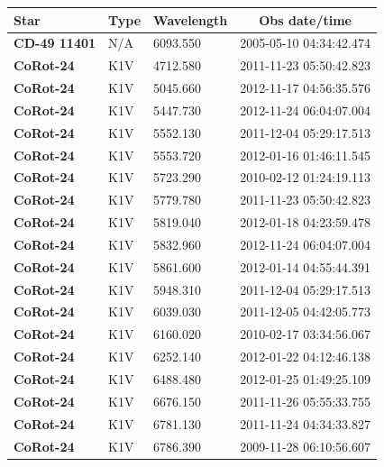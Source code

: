 \documentclass[linenumbers]{aastex701}
\providecommand{\DIFadd}[1]{{\bf #1}} %
\providecommand{\DIFaddbegin}{} %
\providecommand{\DIFaddend}{} %
\begin{document}
\begin{longtable}{|l|l|l|c|}
\hline
Star & Type & Wavelength & Obs date/time \\
\hline
 \DIFaddbegin \DIFadd{CD-49 11401 }\DIFaddend & N/A & 6093.550 & 2005-05-10 04:34:42.474 \\
 \DIFaddbegin \DIFadd{CoRot-24 }\DIFaddend & K1V & 4712.580 & 2011-11-23 05:50:42.823 \\
 \DIFaddbegin \DIFadd{CoRot-24 }\DIFaddend & K1V & 5045.660 & 2012-11-17 04:56:35.576 \\
 \DIFaddbegin \DIFadd{CoRot-24 }\DIFaddend & K1V & 5447.730 & 2012-11-24 06:04:07.004 \\
 \DIFaddbegin \DIFadd{CoRot-24 }\DIFaddend & K1V & 5552.130 & 2011-12-04 05:29:17.513 \\
 \DIFaddbegin \DIFadd{CoRot-24 }\DIFaddend & K1V & 5553.720 & 2012-01-16 01:46:11.545 \\
 \DIFaddbegin \DIFadd{CoRot-24 }\DIFaddend & K1V & 5723.290 & 2010-02-12 01:24:19.113 \\
 \DIFaddbegin \DIFadd{CoRot-24 }\DIFaddend & K1V & 5779.780 & 2011-11-23 05:50:42.823 \\
 \DIFaddbegin \DIFadd{CoRot-24 }\DIFaddend & K1V & 5819.040 & 2012-01-18 04:23:59.478 \\
 \DIFaddbegin \DIFadd{CoRot-24 }\DIFaddend & K1V & 5832.960 & 2012-11-24 06:04:07.004 \\
 \DIFaddbegin \DIFadd{CoRot-24 }\DIFaddend & K1V  & 5861.600 & 2012-01-14 04:55:44.391 \\
 \DIFaddbegin \DIFadd{CoRot-24 }\DIFaddend & K1V & 5948.310 & 2011-12-04 05:29:17.513 \\
 \DIFaddbegin \DIFadd{CoRot-24 }\DIFaddend & K1V  & 6039.030 & 2011-12-05 04:42:05.773 \\
 \DIFaddbegin \DIFadd{CoRot-24 }\DIFaddend & K1V & 6160.020 & 2010-02-17 03:34:56.067 \\
 \DIFaddbegin \DIFadd{CoRot-24 }\DIFaddend & K1V & 6252.140 & 2012-01-22 04:12:46.138 \\
 \DIFaddbegin \DIFadd{CoRot-24 }\DIFaddend & K1V & 6488.480 & 2012-01-25 01:49:25.109 \\
 \DIFaddbegin \DIFadd{CoRot-24 }\DIFaddend & K1V & 6676.150 & 2011-11-26 05:55:33.755 \\
 \DIFaddbegin \DIFadd{CoRot-24 }\DIFaddend & K1V & 6781.130 & 2011-11-24 04:34:33.827 \\
 \DIFaddbegin \DIFadd{CoRot-24 }\DIFaddend & K1V & 6786.390 & 2009-11-28 06:10:56.607 \\

\end{longtable}
\end{document}
